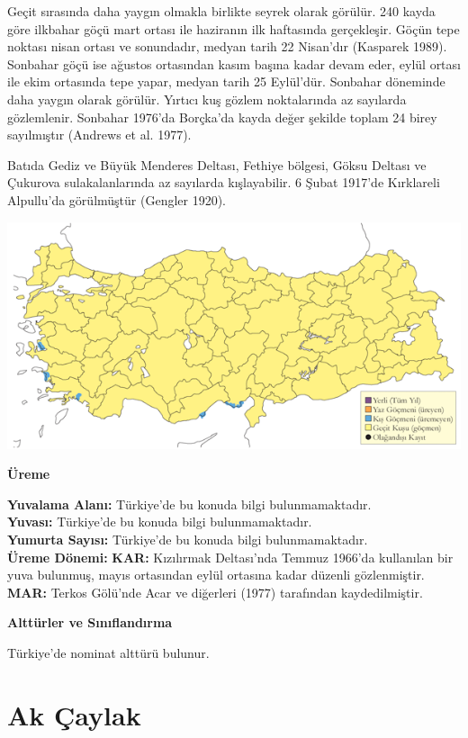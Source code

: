 \documentclass[
  letterpaper,
  DIV=11,
  numbers=noendperiod]{scrreprt}
\begin{document}
Geçit sırasında daha yaygın olmakla birlikte seyrek olarak görülür. 240
kayda göre ilkbahar göçü mart ortası ile haziranın ilk haftasında
gerçekleşir. Göçün tepe noktası nisan ortası ve sonundadır, medyan tarih
22 Nisan'dır (Kasparek 1989). Sonbahar göçü ise ağustos ortasından kasım
başına kadar devam eder, eylül ortası ile ekim ortasında tepe yapar,
medyan tarih 25 Eylül'dür. Sonbahar döneminde daha yaygın olarak
görülür. Yırtıcı kuş gözlem noktalarında az sayılarda gözlemlenir.
Sonbahar 1976'da Borçka'da kayda değer şekilde toplam 24 birey
sayılmıştır (Andrews et al. 1977).

Batıda Gediz ve Büyük Menderes Deltası, Fethiye bölgesi, Göksu Deltası
ve Çukurova sulakalanlarında az sayılarda kışlayabilir. 6 Şubat 1917'de
Kırklareli Alpullu'da görülmüştür (Gengler 1920).

\includegraphics{images/harita_Page_081.png}

\textbf{Üreme}

\textbf{Yuvalama Alanı:} Türkiye'de bu konuda bilgi bulunmamaktadır.\\
\textbf{Yuvası:} Türkiye'de bu konuda bilgi bulunmamaktadır.\\
\textbf{Yumurta Sayısı:} Türkiye'de bu konuda bilgi bulunmamaktadır.\\
\textbf{Üreme Dönemi:} \textbf{KAR:} Kızılırmak Deltası'nda Temmuz
1966'da kullanılan bir yuva bulunmuş, mayıs ortasından eylül ortasına
kadar düzenli gözlenmiştir. \textbf{MAR:} Terkos Gölü'nde Acar ve
diğerleri (1977) tarafından kaydedilmiştir.

\textbf{Alttürler ve Sınıflandırma}

Türkiye'de nominat alttürü bulunur.

\section{Ak Çaylak}\label{ak-uxe7aylak}
\end{document}
